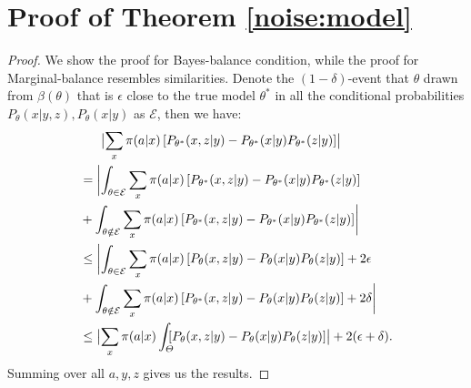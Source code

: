 \section{Proof of Theorem \ref{noise:model}}
\begin{proof}
We show the proof for Bayes-balance condition, while the proof for Marginal-balance resembles similarities. Denote the $(1-\delta)$-event that $\theta$ drawn from $\beta(\theta)$ that is $\epsilon$ close to the true model $\theta^*$ in all the conditional probabilities $P_{\theta}(x|y,z), P_{\theta}(x|y)$ as $\mathcal E$, then we have:
\begin{align*}
  &~~~~~\bigl|\sum_x \pol(a | x)
    \left[P_{\param^*}(x, z | y)
  - P_{\param^*}(x | y) P_{\param^*}(z | y) \right]\bigr|\\
  &= \biggl|\int_{\theta \in \mathcal E} \sum_x \pol(a | x)
    \left[P_{\param^*}(x, z | y)
  - P_{\param^*}(x | y) P_{\param^*}(z | y) \right]\\
  &+\int_{\theta \notin \mathcal E}\sum_x \pol(a | x) \left[P_{\param^*}(x, z | y)
  - P_{\param^*}(x | y) P_{\param^*}(z | y) \right]\biggr|\\
  &\leq \biggl|\int_{\theta \in \mathcal E} \sum_x \pol(a | x)
    \left[P_{\param}(x, z | y)
  - P_{\param}(x | y) P_{\param}(z | y) \right] +2\epsilon\\
  &+\int_{\theta \notin \mathcal E}\sum_x \pol(a | x) \left[P_{\param^*}(x, z | y)
  - P_{\param}(x | y) P_{\param}(z | y) \right] + 2\delta\biggr|\\
  &\le \bigl |\sum_x \pol(a | x)
  \int_{\mathrlap{\Param }}
    \left[P_\param(x, z | y)
  - P_\param(x | y) P_\param(z | y) \right]\bigr| +  2(\epsilon+\delta).
  \end{align*}
  Summing over all $a,y,z$ gives us the results. 
\end{proof}
~\\

